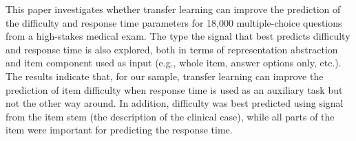 This paper investigates whether transfer learning can improve the prediction of the difficulty and response time parameters for  18,000 multiple-choice questions from a high-stakes medical exam. The type the signal that best predicts difficulty and response time is also explored, both in terms of representation abstraction and item component used as input (e.g., whole item, answer options only, etc.). The results indicate that, for our sample, transfer learning can improve the prediction of item difficulty when response time is used as an auxiliary task but not the other way around. In addition, difficulty was best predicted using signal from the item stem (the description of the clinical case), while all parts of the item were important for predicting the response time.
